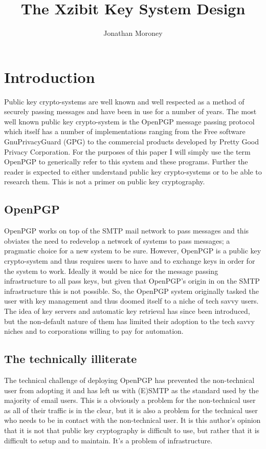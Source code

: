 \documentclass[a4paper,11pt]{article}
\title{The Xzibit Key System Design}
\author{Jonathan Moroney}
\begin{document}
\maketitle
\section{Introduction}
Public key crypto-systems are well known and well respected as a method of securely passing messages and have been in use for a number of years. The most well known public key crypto-system is the OpenPGP message passing protocol which itself has a number of implementations ranging from the Free software GnuPrivacyGuard (GPG) to the commercial products developed by Pretty Good Privacy Corporation. For the purposes of this paper I will simply use the term OpenPGP to generically refer to this system and these programs. Further the reader is expected to either understand public key crypto-systems or to be able to research them. This is not a primer on public key cryptography.
\subsection{OpenPGP}
OpenPGP works on top of the SMTP mail network to pass messages and this obviates the need to redevelop a network of systems to pass messages; a pragmatic choice for a new system to be sure. However, OpenPGP is a public key crypto-system and thus requires users to have and to exchange keys in order for the system to work. Ideally it would be nice for the message passing infrastructure to all pass keys, but given that OpenPGP's origin in on the SMTP infrastructure this is not possible. So, the OpenPGP system originally tasked the user with key management and thus doomed itself to a niche of tech savvy users. The idea of key servers and automatic key retrieval has since been introduced, but the non-default nature of them has limited their adoption to the tech savvy niches and to corporations willing to pay for automation. 
\subsection{The technically illiterate}
The technical challenge of deploying OpenPGP has prevented the non-technical user from adopting it and has left us with (E)SMTP as the standard used by the majority of email users. This is a obviously a problem for the non-technical user as all of their traffic is in the clear, but it is also a problem for the technical user who needs to be in contact with the non-technical user. It is this author's opinion that it is not that public key cryptography is difficult to use, but rather that it is difficult to setup and to maintain. It's a problem of infrastructure.
\end{document}
